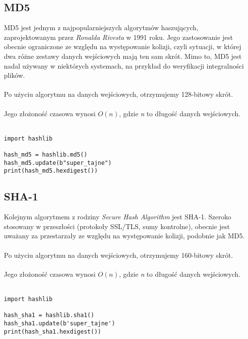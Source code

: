 \documentclass{article}
\begin{document}
    \clearpage

    \subsection{MD5}
    \label{subsection:md5}
        MD5 jest jednym z najpopularniejszych algorytmów haszujących, zaprojektowanym przez \textit{Ronalda Rivesta} w 1991 roku.
        Jego zastosowanie jest obecnie ograniczone ze względu na występowanie kolizji, czyli sytuacji, w której dwa różne zestawy danych wejściowych mają ten sam skrót.
        Mimo to, MD5 jest nadal używany w niektórych systemach, na przykład do weryfikacji integralności plików.
        \\
        \\
        Po użyciu algorytmu na danych wejściowych, otrzymujemy 128-bitowy skrót.
        \\
        \\
        Jego złożoność czasowa wynosi $O(n)$, gdzie \textit{n} to długość danych wejściowych.
        \\
        \\
\begin{lstlisting}[title=Przykładowa implementacja w języku Python, label=lst:md5-example]
import hashlib

hash_md5 = hashlib.md5()
hash_md5.update(b"super_tajne")
print(hash_md5.hexdigest())
\end{lstlisting}

    \subsection{SHA-1}
    \label{subsection:sha-1}
        Kolejnym algorytmem z rodziny \textit{Secure Hash Algorithm} jest SHA-1.
        Szeroko stosowany w przeszłości (protokoły SSL/TLS, sumy kontrolne), obecnie jest uważany za przestarzały ze względu na występowanie kolizji, podobnie jak MD5.
        \\
        \\
        Po użyciu algorytmu na danych wejściowych, otrzymujemy 160-bitowy skrót.
        \\
        \\
        Jego złożoność czasowa wynosi $O(n)$, gdzie \textit{n} to długość danych wejściowych.
        \\
        \\
\begin{lstlisting}[title=Przykładowa implementacja w języku Python, label=lst:sha-1-example]
import hashlib

hash_sha1 = hashlib.sha1()
hash_sha1.update(b'super_tajne')
print(hash_sha1.hexdigest())
\end{lstlisting}
\end{document}
